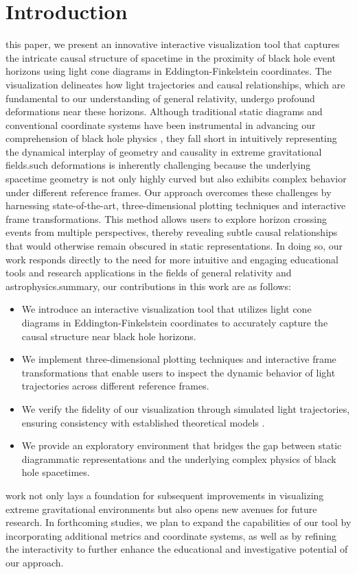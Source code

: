 \documentclass{article}
\begin{document}
\section{Introduction}\nIn this paper, we present an innovative interactive visualization tool that captures the intricate causal structure of spacetime in the proximity of black hole event horizons using light cone diagrams in Eddington-Finkelstein coordinates. The visualization delineates how light trajectories and causal relationships, which are fundamental to our understanding of general relativity, undergo profound deformations near these horizons. Although traditional static diagrams and conventional coordinate systems have been instrumental in advancing our comprehension of black hole physics \cite{ref1}, they fall short in intuitively representing the dynamical interplay of geometry and causality in extreme gravitational fields.\n\nVisualizing such deformations is inherently challenging because the underlying spacetime geometry is not only highly curved but also exhibits complex behavior under different reference frames. Our approach overcomes these challenges by harnessing state-of-the-art, three-dimensional plotting techniques and interactive frame transformations. This method allows users to explore horizon crossing events from multiple perspectives, thereby revealing subtle causal relationships that would otherwise remain obscured in static representations. In doing so, our work responds directly to the need for more intuitive and engaging educational tools and research applications in the fields of general relativity and astrophysics.\n\nIn summary, our contributions in this work are as follows:\n\begin{itemize}\n  \item We introduce an interactive visualization tool that utilizes light cone diagrams in Eddington-Finkelstein coordinates to accurately capture the causal structure near black hole horizons.\n  \item We implement three-dimensional plotting techniques and interactive frame transformations that enable users to inspect the dynamic behavior of light trajectories across different reference frames.\n  \item We verify the fidelity of our visualization through simulated light trajectories, ensuring consistency with established theoretical models \cite{ref2}.\n  \item We provide an exploratory environment that bridges the gap between static diagrammatic representations and the underlying complex physics of black hole spacetimes.\n\end{itemize}\n\nThis work not only lays a foundation for subsequent improvements in visualizing extreme gravitational environments but also opens new avenues for future research. In forthcoming studies, we plan to expand the capabilities of our tool by incorporating additional metrics and coordinate systems, as well as by refining the interactivity to further enhance the educational and investigative potential of our approach.
\end{document}
